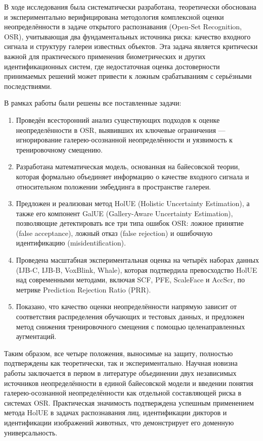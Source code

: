 В ходе исследования была систематически разработана, теоретически обоснована и экспериментально верифицирована методология комплексной оценки неопределённости в задаче открытого распознавания (Open-Set Recognition, OSR), учитывающая два фундаментальных источника риска: качество входного сигнала и структуру галереи известных объектов. 
Эта задача является критически важной для практического применения биометрических и других идентификационных систем, где недостаточная оценка достоверности принимаемых решений может привести к ложным срабатываниям с серьёзными последствиями.

В рамках работы были решены все поставленные задачи:
\begin{enumerate}  
    \item Проведён всесторонний анализ существующих подходов к оценке неопределённости в OSR, выявивших их ключевые ограничения — игнорирование галерею-осознанной неопределённости и уязвимость к тренировочному смещению.
    \item Разработана математическая модель, основанная на байесовской теории, которая формально объединяет информацию о качестве входного сигнала и относительном положении эмбеддинга в пространстве галереи.
    \item Предложен и реализован метод HolUE (Holistic Uncertainty Estimation), а также его компонент GalUE (Gallery-Aware Uncertainty Estimation), позволяющие детектировать все три типа ошибок OSR: ложное принятие (false acceptance), ложный отказ (false rejection) и ошибочную идентификацию (misidentification).
    \item Проведена масштабная экспериментальная оценка на четырёх наборах данных (IJB-C, IJB-B, VoxBlink, Whale), которая подтвердила превосходство HolUE над современными методами, включая SCF, PFE, ScaleFace и AccScr, по метрике Prediction Rejection Ratio (PRR).
    \item Показано, что качество оценки неопределённости напрямую зависит от соответствия распределения обучающих и тестовых данных, и предложен метод снижения тренировочного смещения с помощью целенаправленных аугментаций.
\end{enumerate}
Таким образом, все четыре положения, выносимые на защиту, полностью подтверждены как теоретически, так и экспериментально.
Научная новизна работы заключается в первом в литературе объединении двух независимых источников неопределённости в единой байесовской модели и введении понятия галерею-осознанной неопределённости как отдельной составляющей риска в системах OSR. 
Практическая значимость подтверждена успешным применением метода HolUE в задачах распознавания лиц, идентификации дикторов и идентификации изображений животных, что демонстрирует его доменную универсальность.

